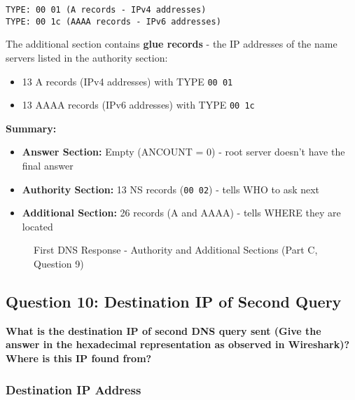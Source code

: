\documentclass[11pt,letterpaper]{article}
\begin{document}
\begin{hexbox}
\begin{lstlisting}[style=hexstyle]
TYPE: 00 01 (A records - IPv4 addresses)
TYPE: 00 1c (AAAA records - IPv6 addresses)
\end{lstlisting}
\end{hexbox}

The additional section contains \textbf{glue records} - the IP addresses of the name servers listed in the authority section:
\begin{itemize}
    \item 13 A records (IPv4 addresses) with TYPE \texttt{00 01}
    \item 13 AAAA records (IPv6 addresses) with TYPE \texttt{00 1c}
\end{itemize}

\textbf{Summary:}
\begin{itemize}
    \item \textbf{Answer Section:} Empty (ANCOUNT = 0) - root server doesn't have the final answer
    \item \textbf{Authority Section:} 13 NS records (\texttt{00 02}) - tells WHO to ask next
    \item \textbf{Additional Section:} 26 records (A and AAAA) - tells WHERE they are located
\end{itemize}

\begin{figure}[h]
    \centering
    \caption{First DNS Response - Authority and Additional Sections (Part C, Question 9)}
    \label{fig:partc_q9}
\end{figure}

\newpage

\subsection{Question 10: Destination IP of Second Query}

\textbf{What is the destination IP of second DNS query sent (Give the answer in the hexadecimal representation as observed in Wireshark)? Where is this IP found from?}

\subsubsection{Destination IP Address}
\end{document}
